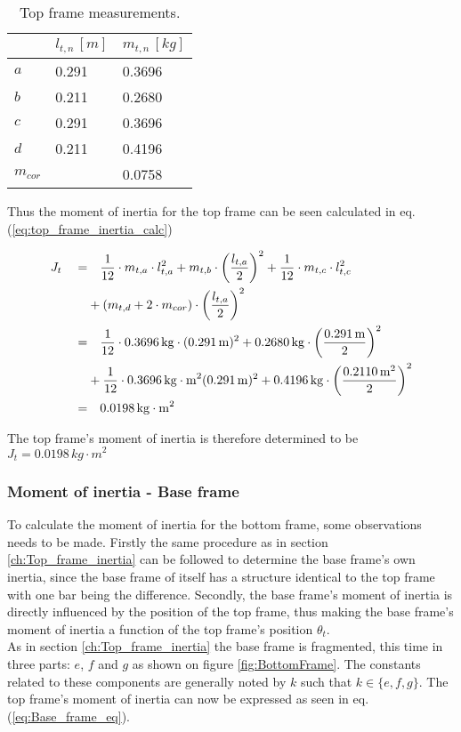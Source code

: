 \documentclass[../../main]{subfiles}
\begin{document}
\begin{table}[H]
\centering
\begin{tabular}{|l|l|l|}
\hline
  & $l_{t,n} \, \si{[m]}$ & $m_{t,n} \, \si{[kg]}$ \\
\hline
$a$ & 0.291  & 0.3696  \\
\hline
$b$ & 0.211  & 0.2680  \\
\hline
$c$ & 0.291 & 0.3696  \\
\hline
$d$ & 0.211 & 0.4196  \\
\hline
$m_{cor}$ & & 0.0758 \\
\hline
\end{tabular}
\caption{Top frame measurements.}
    \label{tab:Top_frame_table}
\end{table}

Thus the moment of inertia for the top frame can be seen calculated in eq. (\ref{eq:top_frame_inertia_calc})

\begin{equation}
  \centering
    \label{eq:top_frame_inertia_calc}
  \begin{split}
      J_t  \quad  =&  \quad \frac{1}{12} \cdot m_{t,a} \cdot l_{t,a}^2 + m_{t,b} \cdot \left(\frac{l_{t,a}}{2}\right)^2 + \frac{1}{12} \cdot m_{t,c}\cdot l_{t,c}^2\\
      &+ (m_{t,d} + 2 \cdot m_{cor}) \cdot \left( \frac{l_{t,a}}{2}\right)^2 \\
      =& \quad \frac{1}{12} \cdot 0.3696 \si{\,kg}  \cdot (0.291 \si{\,m})^2
      + 0.2680 \si{\,kg} \cdot \left(\frac{0.291 \si{\,m}}{2}\right)^2 \\
      &+ \frac{1}{12} \cdot 0.3696 \si{\,kg\cdot m^2} (0.291 \si{\,m})^2
      + 0.4196 \si{\,kg} \cdot \left( \frac{0.2110\si{\,m}^2}{2} \right)^2 \\
      =& \quad 0.0198 \si{\,kg\cdot m^2}
  \end{split}
\end{equation}

The top frame's moment of inertia is therefore determined to be
\newline $J_{t} = 0.0198 \si{\,kg\cdot m^2}$

\subsubsection{Moment of inertia - Base frame}
To calculate the moment of inertia for the bottom frame, some observations needs to be made. Firstly the same procedure as in section \ref{ch:Top_frame_inertia} can be followed to determine the base frame's own inertia, since the base frame of itself has a structure identical to the top frame with one bar being the difference. Secondly, the base frame's moment of inertia is directly influenced by the position of the top frame, thus making the base frame's moment of inertia a function of the top frame's position $\theta_t$.\\
As in section \ref{ch:Top_frame_inertia} the base frame is fragmented, this time in three parts: $e$, $f$ and $g$ as shown on figure \ref{fig:BottomFrame}. The constants related to these components are generally noted by $k$ such that $k \in \{e,f,g\}$. The top frame's moment of inertia can now be expressed as seen in eq. (\ref{eq:Base_frame_eq}).
\end{document}
